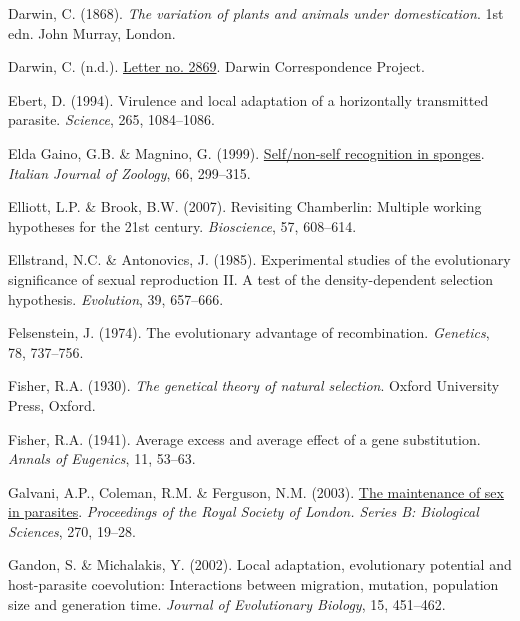 \documentclass[
  letterpaper,
]{book}
\newlength{\cslhangindent}
\newenvironment{CSLReferences}[2] %
 {\begin{list}{}{%
  \setlength{\itemindent}{0pt}
  \setlength{\leftmargin}{0pt}
  \setlength{\parsep}{0pt}
  \ifodd #1
   \setlength{\leftmargin}{\cslhangindent}
   \setlength{\itemindent}{-1\cslhangindent}
  \fi
  \setlength{\itemsep}{#2\baselineskip}}}
 {\end{list}}
\begin{document}
\begin{CSLReferences}{1}{0}
Darwin, C. (1868). \emph{The variation of plants and animals under
domestication}. 1st edn. John Murray, London.

Darwin, C. (n.d.).
\href{https://www.darwinproject.ac.uk/letter/?docId=letters/DCP-LETT-2869.xml}{Letter
no. 2869}. Darwin Correspondence Project.

Ebert, D. (1994). Virulence and local adaptation of a horizontally
transmitted parasite. \emph{Science}, 265, 1084--1086.

Elda Gaino, G.B. \& Magnino, G. (1999).
\href{https://doi.org/10.1080/11250009909356270}{Self/non‐self
recognition in sponges}. \emph{Italian Journal of Zoology}, 66,
299--315.

Elliott, L.P. \& Brook, B.W. (2007). Revisiting {C}hamberlin: Multiple
working hypotheses for the 21st century. \emph{Bioscience}, 57,
608--614.

Ellstrand, N.C. \& Antonovics, J. (1985). Experimental studies of the
evolutionary significance of sexual reproduction II. A test of the
density-dependent selection hypothesis. \emph{Evolution}, 39, 657--666.

Felsenstein, J. (1974). The evolutionary advantage of recombination.
\emph{Genetics}, 78, 737--756.

Fisher, R.A. (1930). \emph{The genetical theory of natural selection}.
Oxford University Press, Oxford.

Fisher, R.A. (1941). Average excess and average effect of a gene
substitution. \emph{Annals of Eugenics}, 11, 53--63.

Galvani, A.P., Coleman, R.M. \& Ferguson, N.M. (2003).
\href{https://doi.org/10.1098/rspb.2002.2182}{The maintenance of sex in
parasites}. \emph{Proceedings of the Royal Society of London. Series B:
Biological Sciences}, 270, 19--28.

Gandon, S. \& Michalakis, Y. (2002). Local adaptation, evolutionary
potential and host-parasite coevolution: Interactions between migration,
mutation, population size and generation time. \emph{Journal of
Evolutionary Biology}, 15, 451--462.


\end{CSLReferences}
\end{document}
